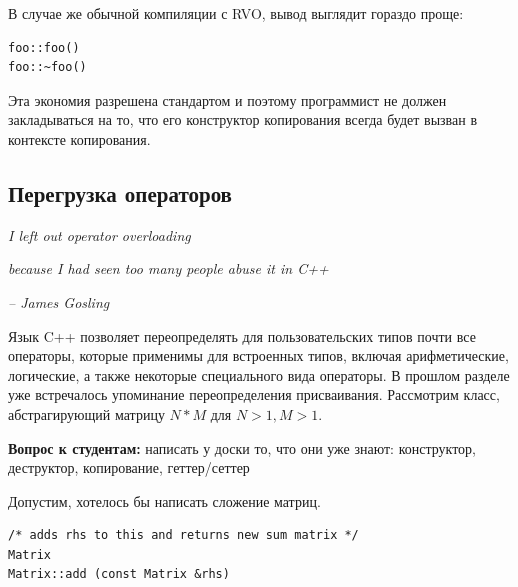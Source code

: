 \documentclass[a4paper,12pt,oneside]{article}
\newif\ifanswers
\begin{document}
В случае же обычной компиляции с RVO, вывод выглядит гораздо проще:

\begin{lstlisting}
foo::foo()
foo::~foo()
\end{lstlisting}

Эта экономия разрешена стандартом и поэтому программист не должен закладываться на то, что его конструктор копирования всегда будет вызван в контексте копирования.

\pagebreak
\subsection{Перегрузка операторов}\label{OperatorOverloading}

\hfill\textit{I left out operator overloading}

\hfill\textit{because I had seen too many people abuse it in C++}{\vspace{0.5em}}

\hfill\textit{-- James Gosling}

Язык C++ позволяет переопределять для пользовательских типов почти все операторы, которые применимы для встроенных типов, включая арифметические, логические, а также некоторые специального вида операторы. В прошлом разделе уже встречалось упоминание переопределения присваивания. Рассмотрим класс, абстрагирующий матрицу $N*M$ для $N>1, M>1$.

\textbf{Вопрос к студентам:} написать у доски то, что они уже знают: конструктор, деструктор, копирование, геттер/сеттер

\ifanswers
Возможный ответ:

\begin{lstlisting}
class Matrix
{
public:
  Matrix (int n, int m) : m_n (n), m_m (m), m_buf (new int[n*m]()) {}
  ~Matrix () { delete [] m_buf; }

  Matrix (const Matrix &rhs) : m_n (rhs.m_n), m_m (rhs.m_m), m_buf (new int[m_n * m_m])
    {
      std::memcpy (m_buf, rhs.m_buf, rhs.m_n * rhs.m_m * sizeof (int));
    }

  void set (int x, int y, int val) { m_buf[x*m_m + y] = val; }
  int get (int x, int y) { return m_buf[x*m_m + y]; }

private:
  int m_n, m_m;
  int *m_buf;
};
\end{lstlisting}
\fi

Допустим, хотелось бы написать сложение матриц.

\begin{lstlisting}
/* adds rhs to this and returns new sum matrix */
Matrix
Matrix::add (const Matrix &rhs)
\end{lstlisting}
\end{document}
